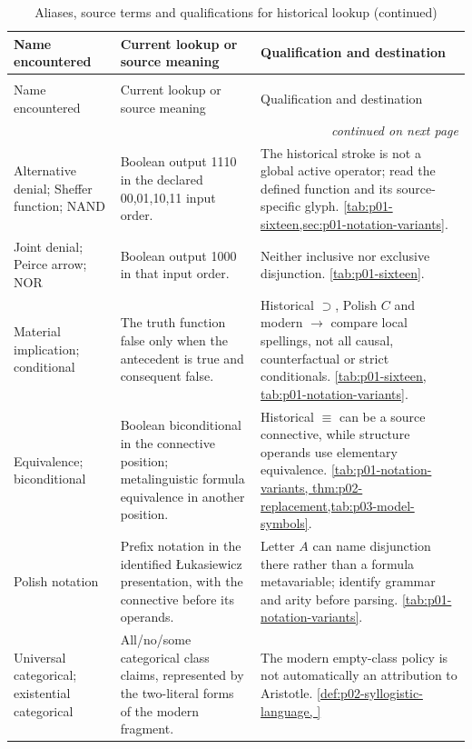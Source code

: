 \begin{longtable}{@{}p{}p{}p{}@{}}
\caption{Aliases, source terms and qualifications for historical lookup.}
\label{tab:p14-glossary-names}\\
\toprule
Name encountered & Current lookup or source meaning & Qualification and destination \\
\midrule
\endfirsthead
\caption[]{Aliases, source terms and qualifications for historical lookup (continued)}\\
\toprule
Name encountered & Current lookup or source meaning & Qualification and destination \\
\midrule
\endhead
\midrule\multicolumn{3}{r}{\emph{continued on next page}}\\
\endfoot
\endlastfoot
Alternative denial; Sheffer function; NAND & Boolean output 1110 in the
declared 00,01,10,11 input order. & The historical stroke is not a global
active operator; read the defined function and its source-specific glyph.
\cref{tab:p01-sixteen,sec:p01-notation-variants}. \\
Joint denial; Peirce arrow; NOR & Boolean output 1000 in that input order. &
Neither inclusive nor exclusive disjunction. \cref{tab:p01-sixteen}. \\
Material implication; conditional & The truth function false only when the
antecedent is true and consequent false. & Historical \(\supset\),
Polish \(C\) and modern \(\to\) compare local spellings, not all causal,
counterfactual or strict conditionals. \cref{tab:p01-sixteen,
tab:p01-notation-variants}. \\
Equivalence; biconditional & Boolean biconditional in the connective
position; metalinguistic formula equivalence in another position. &
Historical \(\equiv\) can be a source connective, while structure
operands use elementary equivalence. \cref{tab:p01-notation-variants,
thm:p02-replacement,tab:p03-model-symbols}. \\
Polish notation & Prefix notation in the identified {\L}ukasiewicz
presentation, with the connective before its operands. & Letter \(A\)
can name disjunction there rather than a formula metavariable; identify
grammar and arity before parsing. \cref{tab:p01-notation-variants}. \\
Universal categorical; existential categorical & All/no/some categorical
class claims, represented by the two-literal forms of the modern fragment. &
The modern empty-class policy is not automatically an attribution to
Aristotle. \cref{def:p02-syllogistic-language,
}
\end{longtable}

